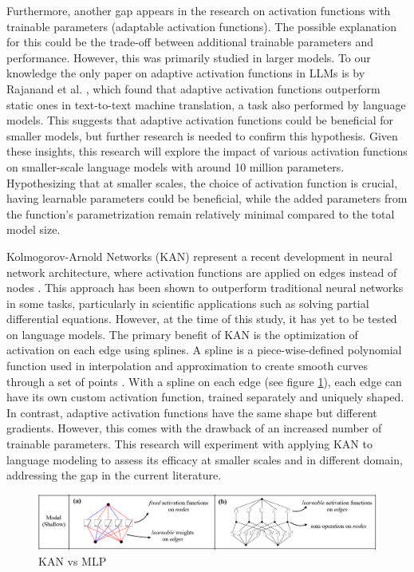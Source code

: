 Furthermore, another gap appears in the research on activation functions with trainable parameters (adaptable activation functions). The possible explanation for this could be the trade-off between additional trainable parameters and performance. However, this was primarily studied in larger models. To our knowledge the only paper on adaptive activation functions in LLMs is by Rajanand et al. \cite{Rajanand}, which found that adaptive activation functions outperform static ones in text-to-text machine translation, a task also performed by language models. This suggests that adaptive activation functions could be beneficial for smaller models, but further research is needed to confirm this hypothesis. Given these insights, this research will explore the impact of various activation functions on smaller-scale language models with around 10 million parameters. Hypothesizing that at smaller scales, the choice of activation function is crucial, having learnable parameters could be beneficial, while the added parameters from the function's parametrization remain relatively minimal compared to the total model size.

Kolmogorov-Arnold Networks (KAN) represent a recent development in neural network architecture, where activation functions are applied on edges instead of nodes \cite{Liu2024}. This approach has been shown to outperform traditional neural networks in some tasks, particularly in scientific applications such as solving partial differential equations. However, at the time of this study, it has yet to be tested on language models. The primary benefit of KAN is the optimization of activation on each edge using splines. A spline is a piece-wise-defined polynomial function used in interpolation and approximation to create smooth curves through a set of points \cite{chaudhuri_b-splines_2021}. With a spline on each edge (see figure \ref{fig:kan}), each edge can have its own custom activation function, trained separately and uniquely shaped. In contrast, adaptive activation functions have the same shape but different gradients. However, this comes with the drawback of an increased number of trainable parameters. This research will experiment with applying KAN to language modeling to assess its efficacy at smaller scales and in different domain, addressing the gap in the current literature.


\begin{figure}[ht]
    \centering
    \includegraphics[width=\columnwidth * 2]{figures/kan-network.png}
    \caption{KAN vs MLP \protect\cite{Liu2024}}
    \label{fig:kan}
\end{figure}